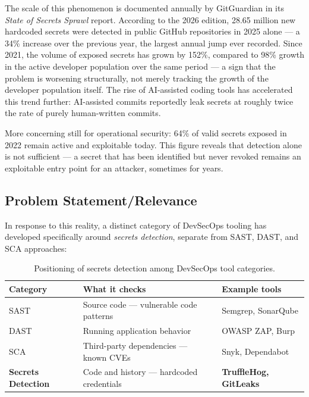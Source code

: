 \documentclass[12pt]{article}
\begin{document}
The scale of this phenomenon is documented annually by GitGuardian in its \emph{State of Secrets Sprawl} report. According to the 2026 edition, 28.65 million new hardcoded secrets were detected in public GitHub repositories in 2025 alone --- a 34\% increase over the previous year, the largest annual jump ever recorded. Since 2021, the volume of exposed secrets has grown by 152\%, compared to 98\% growth in the active developer population over the same period --- a sign that the problem is worsening structurally, not merely tracking the growth of the developer population itself. The rise of AI-assisted coding tools has accelerated this trend further: AI-assisted commits reportedly leak secrets at roughly twice the rate of purely human-written commits.

More concerning still for operational security: 64\% of valid secrets exposed in 2022 remain active and exploitable today. This figure reveals that detection alone is not sufficient --- a secret that has been identified but never revoked remains an exploitable entry point for an attacker, sometimes for years.

\subsection{Problem Statement/Relevance}

In response to this reality, a distinct category of DevSecOps tooling has developed specifically around \emph{secrets detection}, separate from SAST, DAST, and SCA approaches:

\begin{table}[h]
\centering
\begin{tabularx}{\textwidth}{|p{}|Y|p{0.24\textwidth}|}
\hline
\textbf{Category} & \textbf{What it checks} & \textbf{Example tools} \\
\hline
SAST & Source code --- vulnerable code patterns & Semgrep, SonarQube \\
DAST & Running application behavior & OWASP ZAP, Burp \\
SCA & Third-party dependencies --- known CVEs & Snyk, Dependabot \\
\textbf{Secrets Detection} & Code and history --- hardcoded credentials & \textbf{TruffleHog, GitLeaks} \\
\hline
\end{tabularx}
\caption{Positioning of secrets detection among DevSecOps tool categories.}
\label{tab:devsecops-categories}
\end{table}
\end{document}
